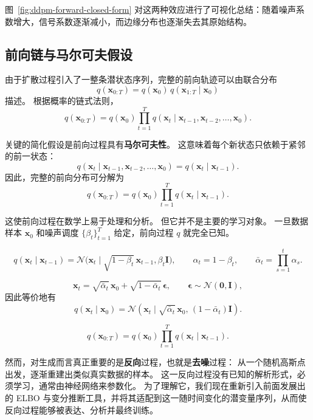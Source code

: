 图~\ref{fig:ddpm-forward-closed-form} 对这两种效应进行了可视化总结：随着噪声系数增大，信号系数逐渐减小，而边缘分布也逐渐失去其原始结构。



\subsection{前向链与马尔可夫假设}

由于扩散过程引入了一整条潜状态序列，完整的前向轨迹可以由联合分布
\[
q(\mathbf{x}_{0:T}) = q(\mathbf{x}_0)\,q(\mathbf{x}_{1:T}\mid \mathbf{x}_0)
\]
描述。
根据概率的链式法则，
\[
q(\mathbf{x}_{0:T})
=
q(\mathbf{x}_0)
\prod_{t=1}^{T}
q(\mathbf{x}_t\mid \mathbf{x}_{t-1},\mathbf{x}_{t-2},\dots,\mathbf{x}_0).
\]

关键的简化假设是前向过程具有\textbf{马尔可夫性}。
这意味着每个新状态只依赖于紧邻的前一状态：
\[
q(\mathbf{x}_t\mid \mathbf{x}_{t-1},\mathbf{x}_{t-2},\dots,\mathbf{x}_0)
=
q(\mathbf{x}_t\mid \mathbf{x}_{t-1}).
\]
因此，完整的前向分布可分解为
\[
q(\mathbf{x}_{0:T})
=
q(\mathbf{x}_0)\prod_{t=1}^{T}q(\mathbf{x}_t\mid \mathbf{x}_{t-1}).
\]

这使前向过程在数学上易于处理和分析。
但它并不是主要的学习对象。
一旦数据样本 $\mathbf{x}_0$ 和噪声调度
$\{\beta_t\}_{t=1}^{T}$ 给定，前向过程 $q$ 就完全已知。

\begin{tcolorbox}[
  colback=blue!6,
  colframe=blue!55!black,
  title={前向过程小结},
  boxrule=0.8pt,
  arc=2mm,
  left=2mm,
  right=2mm,
  top=1mm,
  bottom=1mm
]
\[
q(\mathbf{x}_t\mid \mathbf{x}_{t-1})
=
\mathcal{N}\!\bigl(
\mathbf{x}_t\mid
\sqrt{1-\beta_t}\,\mathbf{x}_{t-1},
\beta_t\mathbf{I}
\bigr),
\qquad
\alpha_t=1-\beta_t,
\qquad
\bar{\alpha}_t=\prod_{s=1}^{t}\alpha_s.
\]

\[
\mathbf{x}_t
=
\sqrt{\bar{\alpha}_t}\,\mathbf{x}_0
+
\sqrt{1-\bar{\alpha}_t}\,\boldsymbol{\epsilon},
\qquad
\boldsymbol{\epsilon}\sim\mathcal{N}(\mathbf{0},\mathbf{I}),
\]
因此等价地有
\[
q(\mathbf{x}_t\mid \mathbf{x}_0)
=
\mathcal{N}\!\left(
\mathbf{x}_t\mid
\sqrt{\bar{\alpha}_t}\,\mathbf{x}_0,\,
(1-\bar{\alpha}_t)\mathbf{I}
\right).
\]

\[
q(\mathbf{x}_{0:T})
=
q(\mathbf{x}_0)\prod_{t=1}^{T}q(\mathbf{x}_t\mid \mathbf{x}_{t-1}).
\]
\end{tcolorbox}

然而，对生成而言真正重要的是\textbf{反向}过程，也就是\textbf{去噪}过程：
从一个随机高斯点出发，逐渐重建出类似真实数据的样本。
这一反向过程没有已知的解析形式，必须学习，通常由神经网络来参数化。
为了理解它，我们现在重新引入前面发展出的 ELBO 与变分推断工具，并将其适配到这一随时间变化的潜变量序列，从而使反向过程能够被表达、分析并最终训练。

